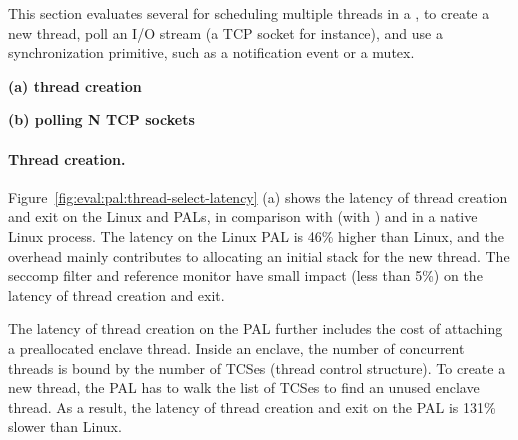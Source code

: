 \label{sec:eval:pal:sched}

This section evaluates several \hostapis{} for scheduling multiple threads
in a \picoproc{},
to create a new thread,
poll an I/O stream (a TCP socket for instance),
and use a synchronization primitive,
such as a notification event or a mutex. 


\begin{figure*}[t!]
\centering
\footnotesize
{}
\parbox{0.49\textwidth}{\centering\bf (a) thread creation}
\parbox{0.49\textwidth}{\centering\bf (b) polling N TCP sockets}
\caption{(a) Thread creation latency and (b) latency of polling a number of TCP sockets.
Lower is better.
The comparison is between (1)  and  on Linux; (2)  and  on the Linux PAL, with and without a \seccomp{} filter ({\bf +SC}) and reference monitor ({\bf +RM}); (3) the same \hostapis{} on the \sgx{} PAL.}
\label{fig:eval:pal:thread-select-latency}
\end{figure*}


\paragraph{Thread creation.}
Figure~\ref{fig:eval:pal:thread-select-latency} (a)
shows the latency of thread creation and exit
on the Linux and \sgx{} PALs,
in comparison with 
 (with )
and  in a native Linux process.
The latency on the Linux PAL is
\roughly{}46\% higher
than Linux,
and the overhead mainly contributes
to allocating an initial stack for the new thread. %
The seccomp{} filter and reference monitor
have small impact (less than 5\%)
on the latency of thread creation and exit.


The latency of thread creation on the \sgx{} PAL further includes
the cost of attaching a preallocated enclave thread.
Inside an enclave,
the number of concurrent threads is bound by the number
of TCSes (thread control structure).
To create a new thread,
the \sgx{} PAL has to walk the list of TCSes
to find an unused enclave thread.
As a result, the latency of thread creation and exit on the \sgx{} PAL is \roughly{}131\% slower than Linux.




